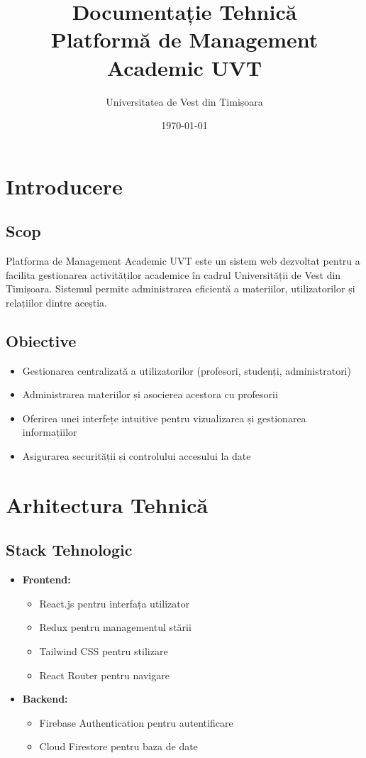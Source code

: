 \documentclass[12pt,a4paper]{article}
\title{Documentație Tehnică\\Platformă de Management Academic UVT}
\author{Universitatea de Vest din Timișoara}
\date{\today}
\begin{document}
\maketitle
\tableofcontents
\newpage

\section{Introducere}
\subsection{Scop}
Platforma de Management Academic UVT este un sistem web dezvoltat pentru a facilita gestionarea activităților academice în cadrul Universității de Vest din Timișoara. Sistemul permite administrarea eficientă a materiilor, utilizatorilor și relațiilor dintre aceștia.

\subsection{Obiective}
\begin{itemize}
    \item Gestionarea centralizată a utilizatorilor (profesori, studenți, administratori)
    \item Administrarea materiilor și asocierea acestora cu profesorii
    \item Oferirea unei interfețe intuitive pentru vizualizarea și gestionarea informațiilor
    \item Asigurarea securității și controlului accesului la date
\end{itemize}

\section{Arhitectura Tehnică}
\subsection{Stack Tehnologic}
\begin{itemize}
    \item \textbf{Frontend:}
    \begin{itemize}
        \item React.js pentru interfața utilizator
        \item Redux pentru managementul stării
        \item Tailwind CSS pentru stilizare
        \item React Router pentru navigare
    \end{itemize}
    \item \textbf{Backend:}
    \begin{itemize}
        \item Firebase Authentication pentru autentificare
        \item Cloud Firestore pentru baza de date
    \end{itemize}
\end{itemize}
\end{document}
